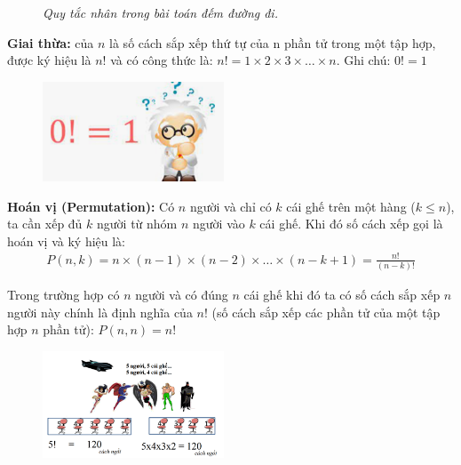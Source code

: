 \begin{multicols}{2}
\begin{multicols}{2}
\begin{figure}[H]
			\caption{\small\textit{Quy tắc nhân trong bài toán đếm đường đi.}}
			\vspace*{-10pt}
		\end{figure}
		\textbf{Giai thừa:} của $n$ là số cách sắp xếp thứ tự của n phần tử trong một tập hợp, được ký hiệu là $n!$ và có công thức là: $n!=1\times 2\times 3\times \ldots\times n $.
		\vskip 0.1cm
		Ghi chú: $0!=1$
		\begin{figure}[H]
			\centering
			\vspace*{-5pt}
			\captionsetup{labelformat=empty, justification=centering}
			\includegraphics[width=0.48\textwidth]{_3}
			\vspace*{-15pt}
		\end{figure}
	\end{multicols}
	\textbf{Hoán vị (Permutation):} Có $n$ người và chỉ có $k$ cái ghế trên một hàng ($k\le n$), ta cần xếp đủ $k$ người từ nhóm $n$ người vào $k$ cái ghế. Khi đó số cách xếp gọi là hoán vị và ký hiệu là:
	\begin{align*}
		P(n,k)=n\times(n-1)\times(n-2)\times\ldots\times(n-k+1)= \frac{n!}{(n-k)!} 
	\end{align*}
	\begin{multicols}{2}
		Trong trường hợp có $n$ người và có đúng $n$ cái ghế khi đó ta có số cách sắp xếp $n$ người này chính là định nghĩa của $n!$ (số cách sắp xếp các phần tử của một tập hợp $n$ phần tử): $P(n,n)=n!$
		\begin{figure}[H]
			\centering
			\captionsetup{labelformat=empty, justification=centering}
			\includegraphics[width=0.48\textwidth]{_4}
			\vspace*{-10pt}
		\end{figure}
	\end{multicols}

\end{multicols}
